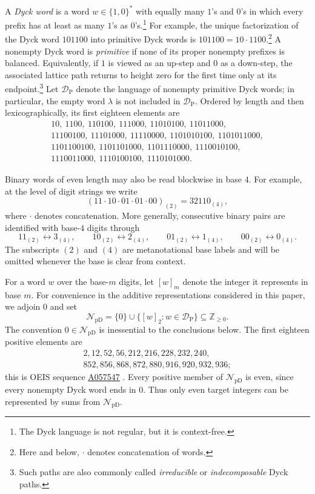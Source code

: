 \documentclass[12pt]{article}
\theoremstyle{plain}
\theoremstyle{definition}
\theoremstyle{plain}
\newcommand{\val}[2]{[#1]_{#2}}
\newcommand{\NpD}{\mathcal{N}_{\mathrm{pD}}}
\newcommand{\DP}{\mathcal{D}_{\mathrm{P}}}
\newcommand{\seqnum}[1]{\href{https://oeis.org/#1}{\rm \underline{#1}}}
\begin{document}
A \emph{Dyck word} is a word $w\in\{1,0\}^*$ with equally many $1$'s
and $0$'s in which every prefix has at least as many $1$'s as $0$'s.\footnote{The
Dyck language is not regular, but it is context-free.}  For example, the
unique factorization of the Dyck word $101100$ into primitive Dyck words is
$101100=10\cdot1100$.\footnote{Here and below, $\cdot$ denotes
concatenation of words.}  A nonempty Dyck word is \emph{primitive} if none of
its proper nonempty prefixes is balanced.  Equivalently, if $1$ is viewed as
an up-step and $0$ as a down-step, the associated lattice path returns to
height zero for the first time only at its endpoint.\footnote{Such paths are
also commonly called \emph{irreducible} or \emph{indecomposable} Dyck paths.}
Let $\DP$ denote the language of nonempty primitive Dyck words; in
particular, the empty word $\lambda$ is not included in $\DP$.  Ordered by length and then
lexicographically, its first eighteen elements are
\[
\begin{gathered}
10,\ 1100,\ 110100,\ 111000,\ 11010100,\ 11011000,\\
11100100,\ 11101000,\ 11110000,\ 1101010100,\ 1101011000,\\
1101100100,\ 1101101000,\ 1101110000,\ 1110010100,\\
1110011000,\ 1110100100,\ 1110101000.
\end{gathered}
\]

Binary words of even length may also be read blockwise in base $4$.
For example, at the level of digit strings we write
\[
 (11\cdot10\cdot01\cdot01\cdot00)_{(2)}=32110_{(4)},
\]
where $\cdot$ denotes concatenation.  More generally, consecutive binary
pairs are identified with base-$4$ digits through
\[
 11_{(2)}\longleftrightarrow3_{(4)},\qquad
 10_{(2)}\longleftrightarrow2_{(4)},\qquad
 01_{(2)}\longleftrightarrow1_{(4)},\qquad
 00_{(2)}\longleftrightarrow0_{(4)}.
\]
The subscripts $(2)$ and $(4)$ are metanotational base labels and will be
omitted whenever the base is clear from context.

For a word $w$ over the base-$m$ digits, let $\val{w}{m}$ denote the
integer it represents in base $m$.  For convenience in the additive
representations considered in this paper, we adjoin $0$ and set
\[
 \NpD=\{0\}\cup\{\val{w}{2}:w\in\DP\}
 \subseteq\mathbb Z_{\geq0}.
\]
The convention $0\in\NpD$ is inessential to the conclusions below.  The
first eighteen positive elements are
\[
\begin{gathered}
2,12,52,56,212,216,228,232,240,\\
852,856,868,872,880,916,920,932,936;
\end{gathered}
\]
this is OEIS sequence \seqnum{A057547} \cite{OEIS-A057547}.  Every positive
member of $\NpD$ is even, since every nonempty Dyck word ends in $0$.
Thus only even target integers can be represented by sums from $\NpD$.
\end{document}

